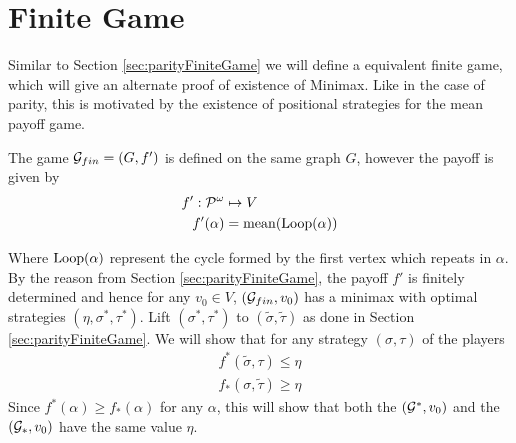\section{Finite Game}
Similar to Section \ref{sec:parityFiniteGame} we will define a equivalent finite game, which will give an alternate proof of  existence of Minimax. Like in the case of parity, this is motivated by the existence of positional strategies for the mean payoff game.

The game $\mathcal{G}_{fin}=(G,f')$ is defined on the same graph $G$, however the payoff is given by
\begin{align}
    f' : \mathcal{P}^\omega &\mapsto V \\
    f'(\alpha) &= \operatorname*{mean}(\operatorname*{Loop}(\alpha))
\end{align}

Where $\operatorname*{Loop}(\alpha)$ represent the cycle formed by the first vertex which repeats in $\alpha$. By the reason from Section \ref{sec:parityFiniteGame}, the payoff $f'$ is finitely determined and hence for any $v_0 \in V$, $(\mathcal{G}_{fin},v_0)$ has a minimax with optimal strategies $(\eta,\sigma^*,\tau^*)$. Lift $(\sigma^*, \tau^*)$ to $(\tilde{\sigma},\tilde{\tau})$ as done in Section \ref{sec:parityFiniteGame}. We will show that for any strategy $(\sigma,\tau)$ of the players
\begin{align}
    f^*(\tilde{\sigma},\tau) \leq \eta \label{inq:meanP0}\\ 
    f_*(\sigma, \tilde{\tau}) \geq \eta \label{inq:meanP1}
\end{align}
Since $f^*(\alpha) \geq f_*(\alpha)$ for any $\alpha$, this will show that both the $(\mathcal{G}^*,v_0)$ and the $(\mathcal{G}_*,v_0)$ have the same value $\eta$.

